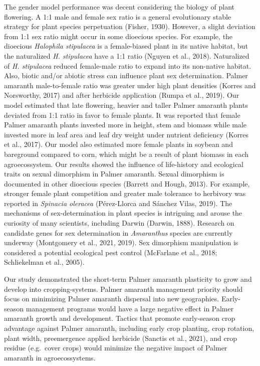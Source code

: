 \documentclass[utf8]{frontiersSCNS}
\begin{document}
The gender model performance was decent considering the biology of plant
flowering. A 1:1 male and female sex ratio is a general evolutionary
stable strategy for plant species perpetuation (Fisher, 1930). However,
a slight deviation from 1:1 sex ratio might occur in some dioecious
species. For example, the dioecious \emph{Halophila stipulacea} is a
female-biased plant in its native habitat, but the naturalized \emph{H.
stipulacea} have a 1:1 ratio (Nguyen et al., 2018). Naturalized of
\emph{H. stipulacea} reduced female-male ratio to expand into its
non-native habitat. Also, biotic and/or abiotic stress can influence
plant sex determination. Palmer amaranth male-to-female ratio was
greater under high plant densities (Korres and Norsworthy, 2017) and
after herbicide application (Rumpa et al., 2019). Our model estimated
that late flowering, heavier and taller Palmer amaranth plants deviated
from 1:1 ratio in favor to female plants. It was reported that female
Palmer amaranth plants invested more in height, stem and biomass while
male invested more in leaf area and leaf dry weight under nutrient
deficiency (Korres et al., 2017). Our model also estimated more female
plants in soybean and bareground compared to corn, which might be a
result of plant biomass in each agroecossystem. Our results showed the
influence of life-history and ecological traits on sexual dimorphism in
Palmer amaranth. Sexual dimorphism is documented in other dioecious
species (Barrett and Hough, 2013). For example, stronger female plant
competition and greater male tolerance to herbivory was reported in
\emph{Spinacia oleracea} (Pérez-Llorca and Sánchez Vilas, 2019). The
mechanisms of sex-determination in plant species is intriguing and
arouse the curiosity of many scientists, including Darwin (Darwin,
1888). Research on candidate genes for sex determination in
\emph{Amaranthus} species are currently underway (Montgomery et al.,
2021, 2019). Sex dimorphism manipulation is considered a potential
ecological pest control (McFarlane et al., 2018; Schliekelman et al.,
2005).

Our study demonstrated the short-term Palmer amaranth plasticity to grow
and develop into cropping-systems. Palmer amaranth management priority
should focus on minimizing Palmer amaranth dispersal into new
geographies. Early-season management programs would have a large
negative effect in Palmer amaranth growth and development. Tactics that
promote early-season crop advantage against Palmer amaranth, including
early crop planting, crop rotation, plant width, preemergence applied
herbicide (Sanctis et al., 2021), and crop residue (e.g.~cover crops)
would minimize the negative impact of Palmer amaranth in
agroecossystems.
\end{document}
